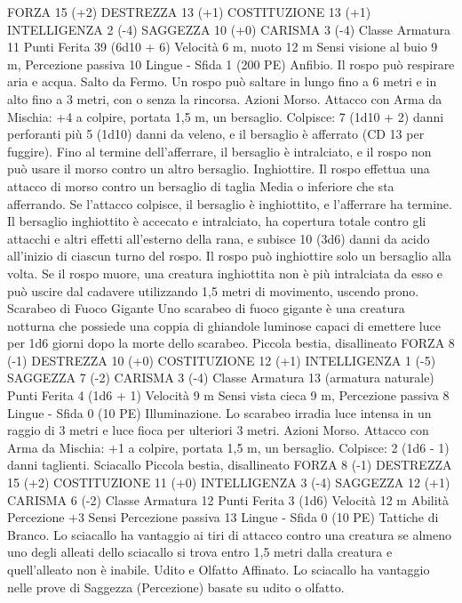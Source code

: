 \begin{multicols}{2}
FORZA 15 (+2)
DESTREZZA 13 (+1)
COSTITUZIONE 13 (+1)
INTELLIGENZA 2 (-4)
SAGGEZZA 10 (+0)
CARISMA 3 (-4)
Classe Armatura 11
Punti Ferita 39 (6d10 + 6)
Velocità 6 m, nuoto 12 m
Sensi visione al buio 9 m, Percezione passiva 10
Lingue -
Sfida 1 (200 PE)
Anfibio. Il rospo può respirare aria e acqua.
Salto da Fermo. Un rospo può saltare in lungo fino a 6 metri e in
alto fino a 3 metri, con o senza la rincorsa.
Azioni
Morso. Attacco con Arma da Mischia: +4 a colpire, portata 1,5
m, un bersaglio.
Colpisce: 7 (1d10 + 2) danni perforanti più 5 (1d10) danni da
veleno, e il bersaglio è afferrato (CD 13 per fuggire). Fino al
termine dell’afferrare, il bersaglio è intralciato, e il rospo non
può usare il morso contro un altro bersaglio.
Inghiottire. Il rospo effettua una attacco di morso contro un
bersaglio di taglia Media o inferiore che sta afferrando. Se
l’attacco colpisce, il bersaglio è inghiottito, e l’afferrare ha
termine. Il bersaglio inghiottito è accecato e intralciato, ha
copertura totale contro gli attacchi e altri effetti all’esterno della
rana, e subisce 10 (3d6) danni da acido all’inizio di ciascun turno
del rospo. Il rospo può inghiottire solo un bersaglio alla volta.
Se il rospo muore, una creatura inghiottita non è più intralciata
da esso e può uscire dal cadavere utilizzando 1,5 metri di
movimento, uscendo prono.
Scarabeo di Fuoco
Gigante
Uno scarabeo di fuoco gigante è una creatura notturna
che possiede una coppia di ghiandole luminose capaci
di emettere luce per 1d6 giorni dopo la morte dello
scarabeo.
Piccola bestia, disallineato
FORZA 8 (-1)
DESTREZZA 10 (+0)
COSTITUZIONE 12 (+1)
INTELLIGENZA 1 (-5)
SAGGEZZA 7 (-2)
CARISMA 3 (-4)
Classe Armatura 13 (armatura naturale)
Punti Ferita 4 (1d6 + 1)
Velocità 9 m
Sensi vista cieca 9 m, Percezione passiva 8
Lingue -
Sfida 0 (10 PE)
Illuminazione. Lo scarabeo irradia luce intensa in un raggio di 3
metri e luce fioca per ulteriori 3 metri.
Azioni
Morso. Attacco con Arma da Mischia: +1 a colpire, portata 1,5
m, un bersaglio.
Colpisce: 2 (1d6 - 1) danni taglienti.
Sciacallo
Piccola bestia, disallineato
FORZA 8 (-1)
DESTREZZA 15 (+2)
COSTITUZIONE 11 (+0)
INTELLIGENZA 3 (-4)
SAGGEZZA 12 (+1)
CARISMA 6 (-2)
Classe Armatura 12
Punti Ferita 3 (1d6)
Velocità 12 m
Abilità Percezione +3
Sensi Percezione passiva 13
Lingue -
Sfida 0 (10 PE)
Tattiche di Branco. Lo sciacallo ha vantaggio ai tiri di attacco
contro una creatura se almeno uno degli alleati dello sciacallo si
trova entro 1,5 metri dalla creatura e quell’alleato non è inabile.
Udito e Olfatto Affinato. Lo sciacallo ha vantaggio nelle prove
di Saggezza (Percezione) basate su udito o olfatto.

\end{multicols}
